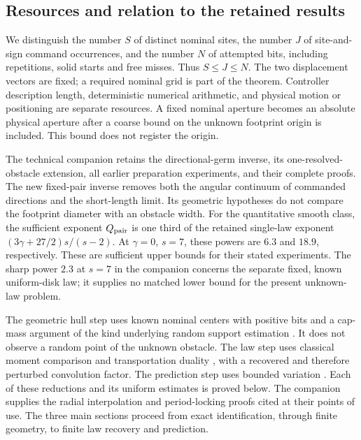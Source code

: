 \subsection{Resources and relation to the retained results}
We distinguish the number $S$ of distinct nominal sites, the number
$J$ of site-and-sign command occurrences, and the number $N$ of
attempted bits, including repetitions, solid starts and free misses.
Thus $S\le J\le N$. The two displacement vectors are fixed; a
required nominal grid is part of the theorem. Controller description
length, deterministic numerical arithmetic, and physical motion or
positioning are separate resources. A fixed nominal aperture becomes
an absolute physical aperture after a coarse bound on the unknown
footprint origin is included. This bound does not register the origin.

The technical companion retains the directional-germ inverse, its
one-resolved-obstacle extension, all earlier preparation experiments,
and their complete proofs. The new fixed-pair inverse removes both
the angular continuum of commanded directions and the short-length
limit. Its geometric hypotheses do not compare the footprint diameter
with an obstacle width. For the quantitative smooth class, the
sufficient exponent $Q_{\rm pair}$ is one third of the retained
single-law exponent $(3\gamma+27/2)s/(s-2)$. At $\gamma=0$, $s=7$,
these powers are $6.3$ and $18.9$, respectively. These are sufficient
upper bounds for their stated experiments. The sharp power $2.3$
at $s=7$ in the companion concerns the separate fixed, known
uniform-disk law; it supplies no matched lower bound for the present
unknown-law problem.

The geometric hull step uses known nominal centers with positive
bits and a cap-mass argument of the kind underlying random support
estimation \cite{BrunelCaps}. It does not observe a random point of
the unknown obstacle. The law step uses classical moment comparison
and transportation duality \cite{RigolletWeed}, with a recovered and
therefore perturbed convolution factor. The prediction step uses
bounded variation \cite{AFP,Galerne}. Each of these reductions and
its uniform estimates is proved below. The companion supplies the
radial interpolation and period-locking proofs cited at their points
of use. The three main sections proceed from exact identification,
through finite geometry, to finite law recovery and prediction.
